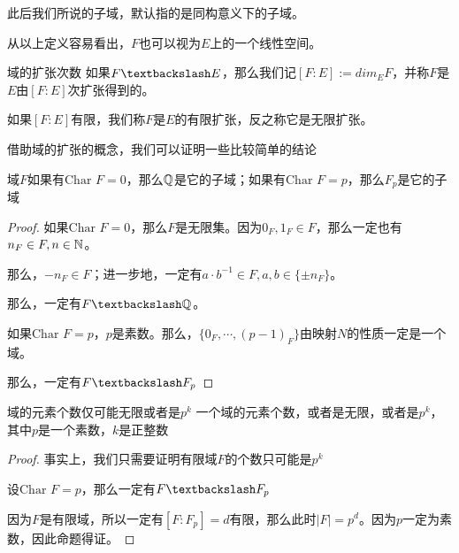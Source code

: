 \documentclass[12pt, a4paper, oneside, UTF8]{ctexbook}
\begin{document}
			此后我们所说的子域，默认指的是同构意义下的子域。

			从以上定义容易看出，$F$也可以视为$E$上的一个线性空间。
			\begin{defn}{域的扩张次数}{}
				如果$F\textbackslash E$，那么我们记$[F:E]:=dim_E F$，并称$F$是$E$由$[F:E]$次扩张得到的。

				如果$[F:E]$有限，我们称$F$是$E$的有限扩张，反之称它是无限扩张。
			\end{defn}
			借助域的扩张的概念，我们可以证明一些比较简单的结论
			\begin{proposition}
				域$F$如果有$\text{Char }F=0$，那么$\mathbb{Q}$是它的子域；如果有$\text{Char }F=p$，那么$F_p$是它的子域
			\end{proposition}
			\begin{proof}
				如果$\text{Char }F=0$，那么$F$是无限集。因为$0_F,1_F \in F$，那么一定也有$n_F \in F,n \in \mathbb{N}$。

				那么，$-n_F \in F$；进一步地，一定有$a \cdot b^{-1} \in F,a,b \in \{\pm n_F\}$。

				那么，一定有$F \textbackslash \Q$。

				如果$\text{Char }F=p$，$p$是素数。那么，$\{0_F,\cdots,(p-1)_F\}$由映射$N$的性质一定是一个域。

				那么，一定有$F \textbackslash F_p$
			\end{proof}
			\begin{them}{域的元素个数仅可能无限或者是$p^k$}{}
				一个域的元素个数，或者是无限，或者是$p^k$，其中$p$是一个素数，$k$是正整数
			\end{them}
			\begin{proof}
				事实上，我们只需要证明有限域$F$的个数只可能是$p^k$

				设$\text{Char }F = p$，那么一定有$F \textbackslash F_p$

				因为$F$是有限域，所以一定有$[F:F_p]=d$有限，那么此时$|F|=p^d$。因为$p$一定为素数，因此命题得证。
			\end{proof}
		
\end{document}
